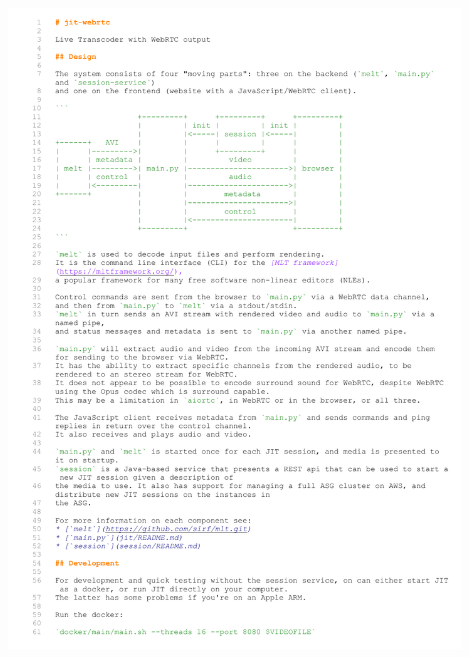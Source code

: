 \documentclass[../MasterThesis.tex]{subfiles}
\begin{document}
\includegraphics[page=1, width=0.9\textwidth]{BE.pdf}
\end{document}
